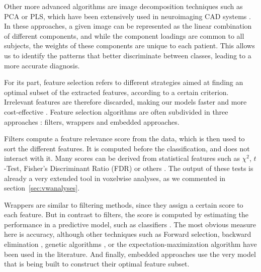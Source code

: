 Other more advanced algorithms are image decomposition techniques such as \ac{PCA} or \ac{PLS}, which have been extensively used in neuroimaging \ac{CAD} systems \cite{Spetsieris2009,Illan2011,Towey2011,Segovia2013,Khedher2015}. In these approaches, a given image can be represented as the linear combination of different components, and while the component loadings are common to all subjects, the weights of these components are unique to each patient. This allows us to identify the patterns that better discriminate between classes, leading to a more accurate diagnosis. 

For its part, feature selection refers to different strategies aimed at finding an optimal subset of the extracted features, according to a certain criterion. Irrelevant features are therefore discarded, making our models faster and more cost-effective \cite{Guyon03}. Feature selection algorithms are often subdivided in three approaches \cite{Martinez-Murcia2016b}: filters, wrappers and embedded approaches. 

Filters compute a feature relevance score from the data, which is then used to sort the different features. It is computed before the classification, and does not interact with it. Many scores can be derived from statistical features such as $\chi^2$, $t$-Test, Fisher's Discriminant Ratio (FDR) or others \cite{Martinez-Murcia2013255,Martinez-Murcia2016b}. The output of these tests is already a very extended tool in voxelwise analyses, as we commented in section~\ref{sec:vwanalyses}. 

Wrappers are similar to filtering methods, since they assign a certain score to each feature. But in contrast to filters, the score is computed by estimating the performance in a predictive model, such as classifiers \cite{Kohavi1995}. The most obvious measure here is accuracy, although other techniques such as Forward selection, backward elimination \cite{Guyon03}, genetic algorithms  \cite{Kohavi1995}, or the expectation-maximization algorithm \cite{Gorriz2009} have been used in the literature. And finally, embedded approaches use the very model that is being built to construct their optimal feature subset. 
